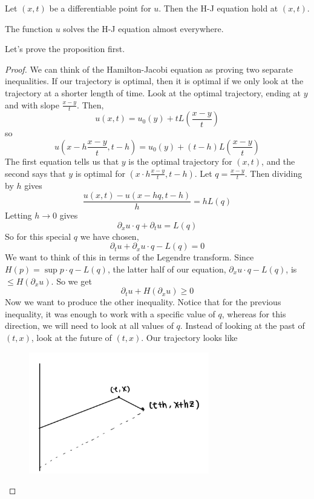 \begin{proposition}
    Let $(x,t)$ be a differentiable point for $u$. Then the H-J equation hold at $(x,t)$.
\end{proposition}

\begin{corollary}
    The function $u$ solves the H-J equation almost everywhere. 
\end{corollary}

Let's prove the proposition first. 
\begin{proof}
    We can think of the Hamilton-Jacobi equation as proving two separate inequalities.
    If our trajectory is optimal, then it is optimal if we only look at the trajectory at a shorter length of time. Look at the optimal trajectory, ending at $y$ and with slope $\frac{x-y}{t}$.
    Then,
$$
u(x, t)=u_{0}(y)+t L\left(\frac{x-y}{t}\right)
$$
so
$$
u\left(x-h \frac{x-y}{t}, t-h\right)=u_{0}(y)+(t-h) L\left(\frac{x-y}{t}\right)
$$
The first equation tells us that $y$ is the optimal trajectory for $(x, t)$, and the second says that $y$ is optimal for $\left(x \cdot h \frac{x-y}{t}, t-h\right)$. Let $q=\frac{x-y}{t}$. Then dividing by $h$ gives
$$
\frac{u(x, t)-u(x-h q, t-h)}{h}=h L(q)
$$
Letting $h \rightarrow 0$ gives
$$
\partial_{x} u \cdot q+\partial_{t} u=L(q)
$$
So for this special $q$ we have chosen,
$$
\partial_{t} u+\partial_{x} u \cdot q-L(q)=0
$$
We want to think of this in terms of the Legendre transform. Since $H(p)=\sup p \cdot q-L(q)$, the latter half of our equation, $\partial_{x} u \cdot q-L(q)$, is $\leq H\left(\partial_{x} u\right) .$ So we get
$$
\partial_{t} u+H\left(\partial_{x} u\right) \geq 0
$$
Now we want to produce the other inequality. Notice that for the previous inequality, it was enough to work with a specific value of $q$, whereas for this direction, we will need to look at all values of $q$. Instead of looking at the past of $(t, x)$, look at the future of $(t, x)$. Our trajectory looks like 

\begin{figure}[H]
    \centering
    \includegraphics[width=0.7\textwidth]{pics/10-1.png}
\end{figure}


\end{proof}

